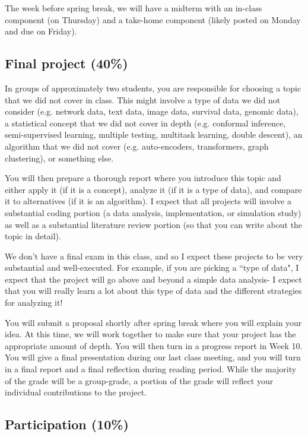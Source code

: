\documentclass[11pt]{article}
\begin{document}
The week before spring break, we will have a midterm with an in-class component (on Thursday) and a take-home component (likely posted on Monday and due on Friday). 


\subsection{Final project (40\%)}

In groups of approximately two students, you are responsible for choosing a topic that we did not cover in class. This might involve a type of data we did not consider (e.g. network data, text data, image data, survival data, genomic data), a statistical concept that we did not cover in depth (e.g. conformal inference, semi-supervised learning, multiple testing, multitask learning, double descent), an algorithm that we did not cover (e.g. auto-encoders, transformers, graph clustering), or something else. 

You will then prepare a thorough report where you introduce this topic and either apply it (if it is a concept), analyze it (if it is a type of data), and compare it to alternatives (if it is an algorithm). I expect that all projects will involve a substantial coding portion (a data analysis, implementation, or simulation study) as well as a substantial literature review portion (so that you can write about the topic in detail). 

We don't have a final exam in this class, and so I expect these projects to be very substantial and well-executed. For example, if you are picking a ``type of data", I expect that the project will go above and beyond a simple data analysis- I expect that you will really learn a lot about this type of data and the different strategies for analyzing it!

You will submit a proposal shortly after spring break where you will explain your idea. At this time, we will work together to make sure that your project has the appropriate amount of depth. You will then turn in a progress report in Week 10. You will give a final presentation during our last class meeting, and you will turn in a final report and a final reflection during reading period. While the majority of the grade will be a group-grade, a portion of the grade will reflect your individual contributions to the project. 

\subsection{Participation (10\%)}
\end{document}
